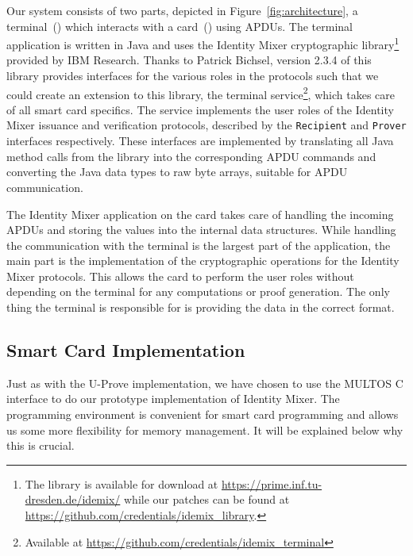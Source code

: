 Our system consists of two parts, depicted in Figure~\ref{fig:architecture}, a
terminal~() which interacts with a
card~() using APDUs. The terminal application is
written in Java and uses the Identity Mixer cryptographic library\footnote{The
library is available for download at \url{https://prime.inf.tu-dresden.de/idemix/}
while our patches can be found at \url{https://github.com/credentials/idemix_library}.}
provided by IBM Research. Thanks to Patrick Bichsel, version 2.3.4 of this
library provides interfaces for the various roles in the protocols such that we
could create an extension to this library, the terminal service\footnote{
Available at \url{https://github.com/credentials/idemix_terminal}}, which takes
care of all smart card specifics. The service implements the user roles of the
Identity Mixer issuance and verification protocols, described by the
\texttt{Recipient} and \texttt{Prover} interfaces respectively. These
interfaces are implemented by translating all Java method calls from the
library into the corresponding APDU commands and converting the Java data types
to raw byte arrays, suitable for APDU communication.

The Identity Mixer application on the card takes care of handling the incoming
APDUs and storing the values into the internal data structures. While handling
the communication with the terminal is the largest part of the application, the
main part is the implementation of the cryptographic operations for the Identity
Mixer protocols. This allows the card to perform the user roles without
depending on the terminal for any computations or proof generation. The only
thing the terminal is responsible for is providing the data in the correct
format.

\subsection{Smart Card Implementation}

Just as with the U-Prove implementation, we have chosen to use the MULTOS C
interface to do our prototype implementation of Identity Mixer. The programming
environment is convenient for smart card programming and allows us some more
flexibility for memory management. It will be explained below why this is
crucial.


